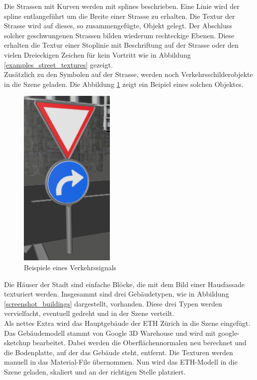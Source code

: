 Die Strassen mit Kurven werden mit \glspl{spline} beschrieben. Eine Linie wird der \gls{spline} entlangeführt um die Breite einer Strasse zu erhalten. Die Textur der Strasse wird auf dieses, so zusammengefügte, Objekt gelegt. Der Abschluss solcher geschwungenen Strassen bilden wiederum rechteckige Ebenen. Diese erhalten die Textur einer Stoplinie mit Beschriftung auf der Strasse oder den vielen Dreieckigen Zeichen für kein Vortritt wie in Abbildung \ref{examples_street_textures} gezeigt. \\
Zusätzlich zu den Symbolen auf der Strasse, werden noch Verkehrsschilderobjekte in die Szene geladen. Die Abbildung \ref{screenshot_trafficsignal} zeigt ein Beipiel eines solchen Objektes. \\
\begin{figure}[H]
\centering 
\includegraphics[scale=0.6]{src/screenshot_trafficsignal.png}
\caption{Beispiele eines Verkehrssignals} %
\label{screenshot_trafficsignal} %
\end{figure}

Die Häuser der Stadt sind einfache Blöcke, die mit dem Bild einer Hausfassade texturiert werden. Insgesammt sind drei Gebäudetypen, wie in Abbildung \ref{screenshot_buildings} dargestellt,  vorhanden. Diese drei Typen werden vervielfacht, eventuell gedreht und in der Szene verteilt.\\
Als nettes Extra wird das Hauptgebäude der ETH Zürich in die Szene eingefügt. Das Gebäudemodell stammt von Google 3D Warehouse und wird mit \gls{google-sketchup} bearbeitet. Dabei werden die Oberflächennormalen neu berechnet und die Bodenplatte, auf der das Gebäude steht, entfernt. Die Texturen werden manuell in das Material-File übernommen. Nun wird das ETH-Modell in die Szene geladen, skaliert und an der richtigen Stelle platziert. 

